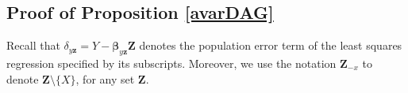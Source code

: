 \documentclass[11pt,a4paper]{article}
\newtheorem{Theorem}[Satz]{Theorem}
\theoremstyle{definition}
\theoremstyle{remark}
\newcommand{\g}[1][G]{\mathcal{#1}}
\begin{document}

\subsection{Proof of Proposition \ref{avarDAG}}
\label{sec:avar}

%
%
%


	Recall that $\delta_{y\mathbf{z}} = Y - \boldsymbol{\beta}_{y\mathbf{z}}\mathbf{Z}$ denotes the population error term of the least squares regression specified by its subscripts. Moreover, we use the notation $\mathbf{Z}_{-x}$ to denote $\mathbf{Z} \setminus \{X\}$, for any set $\mathbf{Z}$.  
	
\end{document}
